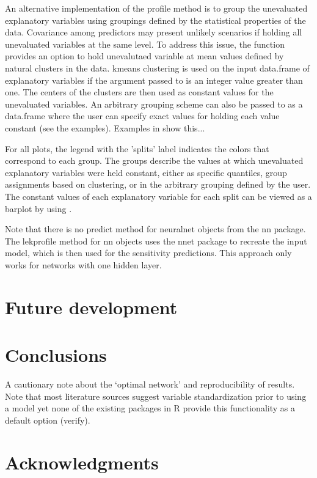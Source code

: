 \documentclass[article]{jss}\usepackage[]{graphicx}\usepackage[]{color}
\begin{document}
An alternative implementation of the profile method is to group the unevaluated explanatory variables using groupings defined by the statistical properties of the data. Covariance among predictors may present unlikely scenarios if holding all unevaluated variables at the same level. To address this issue, the function provides an option to hold unevalutaed variable at mean values defined by natural clusters in the data. kmeans clustering is used on the input data.frame of explanatory variables if the argument passed to  is an integer value greater than one. The centers of the clusters are then used as constant values for the unevaluated variables. An arbitrary grouping scheme can also be passed to  as a data.frame where the user can specify exact values for holding each value constant (see the examples).  Examples in \citet{Beck14a} show this...

For all plots, the legend with the 'splits' label indicates the colors that correspond to each group. The groups describe the values at which unevaluated explanatory variables were held constant, either as specific quantiles, group assignments based on clustering, or in the arbitrary grouping defined by the user. The constant values of each explanatory variable for each split can be viewed as a barplot by using .

Note that there is no predict method for neuralnet objects from the nn package. The lekprofile method for nn objects uses the nnet package to recreate the input model, which is then used for the sensitivity predictions. This approach only works for networks with one hidden layer.

\section[Future development]{Future development}


\section[Conclusions]{Conclusions}

A cautionary note about the `optimal network' and reproducibility of results.  Note that most literature sources suggest variable standardization prior to using a model yet none of the existing packages in R provide this functionality as a default option (verify).    

\section[Acknowledgments]{Acknowledgments}



\end{document}
